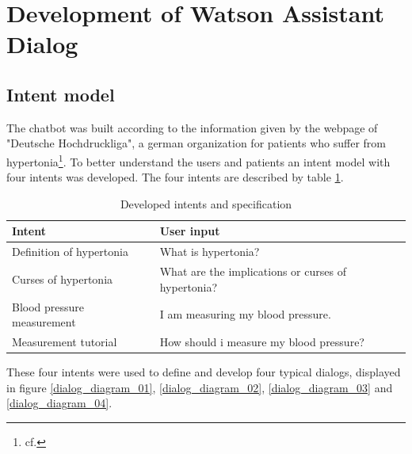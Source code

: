 \section{Development of Watson Assistant Dialog}

\subsection{Intent model} \label{intentmodel}
The chatbot was built according to the information given by the webpage of "Deutsche Hochdruckliga", a german organization for patients who suffer from hypertonia\footnote{cf.\autocite{hochdruckliga}}. 
To better understand the users and patients an intent model with four intents was developed. 
The four intents are described by table \ref{table}. 

\begin{table}[h!]
	
		\begin{tabular}{ |l|l| } 
				\hline
				Intent & User input  \\
				\hline

				Definition of hypertonia  & What is hypertonia?  \\ 
				Curses of hypertonia & What are the implications or curses of hypertonia? \\ 
				Blood pressure measurement &  I am measuring my blood pressure.\\ 
				Measurement tutorial & How should i measure my blood pressure? \\ 
				\hline
		\end{tabular}

      \caption{Developed intents and specification} \label{table}         
\end{table}

These four intents were used to define and develop four typical dialogs, displayed in figure \ref{dialog_diagram_01}, \ref{dialog_diagram_02}, \ref{dialog_diagram_03} and \ref{dialog_diagram_04}.

